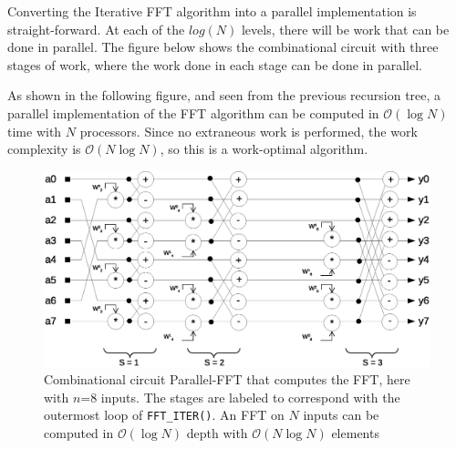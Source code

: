 Converting the Iterative FFT algorithm into a parallel implementation is straight-forward. At each of the $log(N)$ levels, there will be work that can be done in parallel. The figure below shows the combinational circuit with three stages of work, where the work done in each stage can be done in parallel.

As shown in the following figure, and seen from the previous recursion tree, a parallel implementation of the FFT algorithm can be computed in $\mathcal{O}(\log N)$ time with $N$ processors. Since no extraneous work is performed, the work complexity is $\mathcal{O}(N\log N)$, so this is a work-optimal algorithm. 

\begin{figure}[h]
\center
\includegraphics[scale=0.45]{img/parallel_fft_circuit.eps}
\caption{Combinational circuit Parallel-FFT that computes the FFT, here with $n$=8 inputs. The stages are labeled to correspond with the outermost loop of \texttt{FFT\_ITER()}. An FFT on $N$ inputs can be computed in $\mathcal{O}(\log N)$ depth with $\mathcal{O}(N \log N)$ elements}
\end{figure}